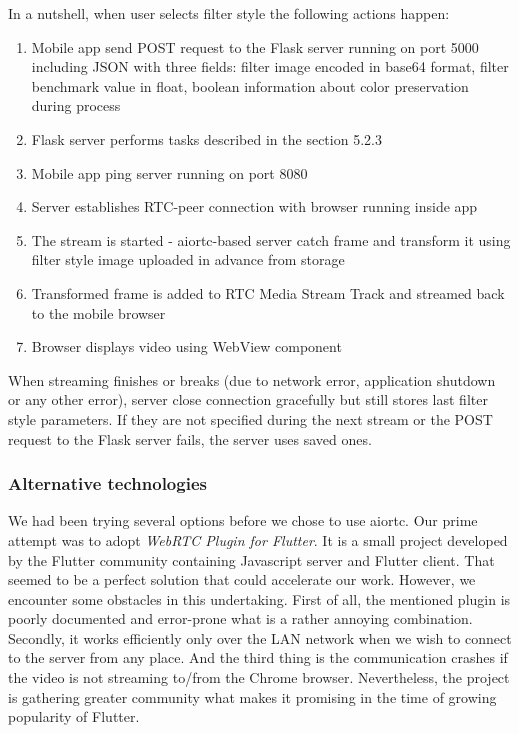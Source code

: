 \documentclass[../Main.tex]{subfiles}
\begin{document}
    In a nutshell, when user selects filter style the following actions happen:
    \begin{enumerate}
    \item Mobile app send POST request to the Flask server running on port 5000 including JSON with three fields: filter image encoded in base64 format, filter benchmark value in float, boolean information about color preservation during process 
    \item Flask server performs tasks described in the section 5.2.3
    \item Mobile app ping server running on port 8080
    \item Server establishes RTC-peer connection with browser running inside app
    \item The stream is started - aiortc-based server catch frame and transform it using filter style image uploaded in advance from storage
    \item Transformed frame is added to RTC Media Stream Track and streamed back to the mobile browser
    \item Browser displays video using WebView component 
    \end{enumerate}
    
    When streaming finishes or breaks (due to network error, application shutdown or any other error), server close connection gracefully but still stores last filter style parameters. If they are not specified during the next stream or the POST request to the Flask server fails, the server uses saved ones. 
    
    \subsubsection{Alternative technologies}
    We had been trying several options before we chose to use aiortc. Our prime attempt was to adopt \textit{WebRTC Plugin for Flutter}. It is a small project developed by the Flutter community containing Javascript server and Flutter client. That seemed to be a perfect solution that could accelerate our work.
    However, we encounter some obstacles in this undertaking. First of all, the mentioned plugin is poorly documented and error-prone what is a rather annoying combination. Secondly, it works efficiently only over the LAN network when we wish to connect to the server from any place. And the third thing is the communication crashes if the video is not streaming to/from the Chrome browser. Nevertheless, the project is gathering greater community what makes it promising in the time of growing popularity of Flutter.
    
\end{document}
